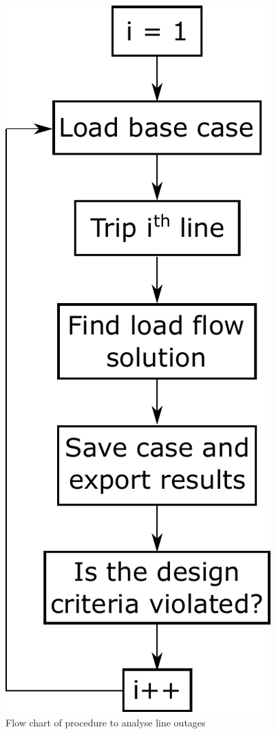 \documentclass[paper=a4, fontsize=11pt]{article}
\begin{document}
\begin{figure}[h]
\centering
\includegraphics[scale=0.50]{fig8_flow.pdf}
\caption{Flow chart of procedure to analyse line outages}
\label{fig:8}
\end{figure}
\end{document}
